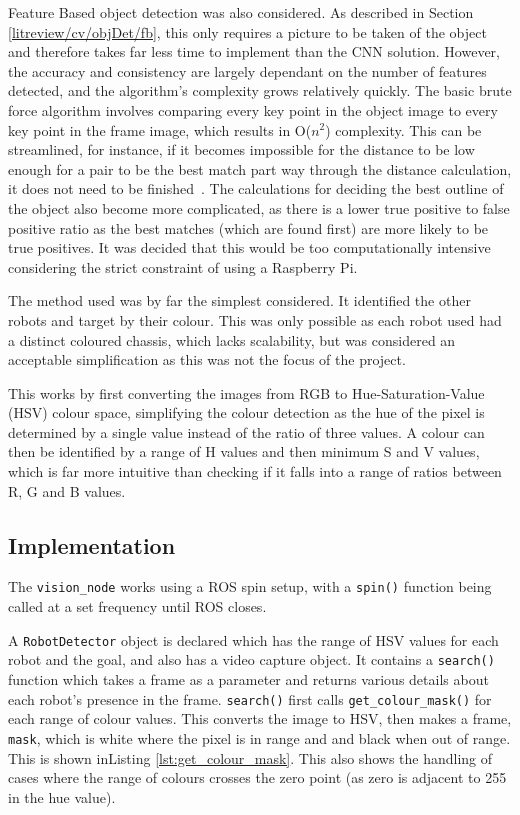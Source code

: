 Feature Based object detection was also considered. As described in
Section \ref{litreview/cv/objDet/fb}, this only requires a picture to be
taken of the object and therefore takes far less time to
implement than the CNN solution. However, the accuracy and
consistency are largely dependant on the number of features
detected, and the algorithm's complexity grows relatively
quickly. The basic brute force algorithm involves comparing
every key point in the object image to every key point in the
frame image, which results in O($n^2$) complexity. This can be streamlined, for instance, if it becomes impossible
for the distance to be low enough for a pair to be the best
match part way through the distance calculation, it does not
need to be finished~\cite{opencv_library}. The calculations for deciding the best
outline of the object also become more complicated, as there
is a lower true positive to false positive ratio as the
best matches (which are found first) are more likely to be
true positives. It was decided that this would be too
computationally intensive considering the strict constraint of
using a Raspberry Pi.

The method used was by far the simplest considered. It identified the other robots and target
by their colour. This was only possible as each robot used had a distinct coloured chassis,
which lacks scalability, but was considered an acceptable simplification as this was not the
focus of the project.

This works by first converting the images from RGB to Hue-Saturation-Value (HSV) colour space,
simplifying the colour detection as the hue of the pixel is determined by a single value
instead of the ratio of three values. A colour can then be identified by a range of H values
and then minimum S and V values, which is far more intuitive than checking if it falls into a
range of ratios between R, G and B values.

\subsection{Implementation}\label{soft/cv/impl}
The \verb|vision_node| works using a ROS spin setup, with a \verb|spin()| function being
called at a set frequency until ROS closes.

A \verb|RobotDetector| object is declared which has the range of HSV values for each robot
and the goal, and also has a video capture object. It contains a \verb|search()| function which
takes a frame as a parameter and returns various details about each robot's presence in the
frame. \verb|search()| first calls \verb|get_colour_mask()| for each range of colour
values. This converts the image to HSV, then makes a frame, \verb|mask|, which is white where
the pixel is in range and and black when out of range. This is shown inListing
\ref{lst:get_colour_mask}. This also shows the handling of cases where the range of colours
crosses the zero point (as zero is adjacent to 255 in the hue value).

